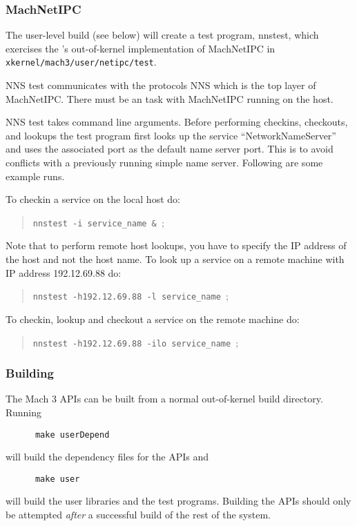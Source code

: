 \subsubsection{MachNetIPC}

The user-level build (see below) will create a test program, nnstest,
which exercises the \xk{}'s
out-of-kernel implementation of MachNetIPC in
{\tt xkernel/mach3/user/netipc/test}.

NNS test communicates with the \xk{} protocols NNS which is the top
layer of MachNetIPC.
There must be an \xk{} task with MachNetIPC running on the host.

NNS test takes command line arguments. Before performing checkins, checkouts,
and lookups the test program first looks up the service ``NetworkNameServer''
and uses the associated port as the default name server port. This is to
avoid conflicts with a previously running simple name server. Following are
some example runs.

\bigskip

\noindent
To checkin a service on the local host do:

\begin{quote}
{\tt nnstest -i service\_name \& };
\end{quote}

\noindent
Note that to perform remote host lookups, you have to specify the 
IP address of the host and not the host name. To look up a service 
on a remote machine with IP address 192.12.69.88 do:

\begin{quote}
{\tt nnstest -h192.12.69.88 -l service\_name };
\end{quote}

\noindent
To checkin, lookup and checkout a service on the remote machine do:

\begin{quote}
{\tt nnstest -h192.12.69.88 -ilo service\_name };
\end{quote}

\subsubsection{Building}

The Mach 3 APIs can be built from a normal out-of-kernel \xk{} build
directory.  Running 

\begin{verbatim}
      make userDepend
\end{verbatim}

\noindent
will build the dependency files for the APIs and 

\begin{verbatim}
      make user
\end{verbatim}

\noindent
will build the user libraries and the test programs.  Building the
APIs should only be attempted {\em after} a successful build of the
rest of the \xk{} system.

